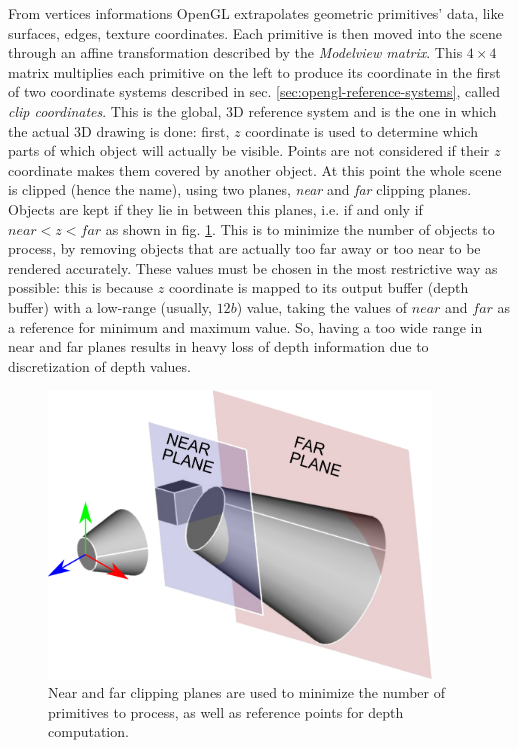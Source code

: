 From vertices informations OpenGL extrapolates geometric primitives'
data, like surfaces, edges, texture coordinates.
Each primitive is then moved into the scene through an affine transformation
described by the \emph{Modelview matrix}. This $4 \times 4$ matrix multiplies
each primitive on the left to produce its coordinate in the first of two
coordinate systems described in sec. \ref{sec:opengl-reference-systems}, called
\emph{clip coordinates}. This is the global, 3D reference system and is the one in
which the actual 3D drawing is done: first, $z$ coordinate is used to determine
which parts of which object will actually be visible. Points are not considered
if their $z$ coordinate makes them covered by another object. At this point the
whole scene is clipped (hence the name), using two planes, \emph{near} and
\emph{far} clipping planes. Objects are kept if they lie in between this planes,
i.e. if and only if $near<z<far$ as shown in fig. \ref{fig:clipping-planes}.
This is to minimize the number of objects to process, by removing objects that
are actually too far away or too near to be rendered accurately. These values
must be chosen in the most restrictive way as possible: this is because $z$
coordinate is mapped to its output buffer (depth buffer) with a low-range
(usually, $12\unit{b}$) value, taking the values of $near$ and $far$ as a
reference for minimum and maximum value. So, having a too wide range in near and
far planes results in heavy loss of depth information due to discretization of
depth values.

\begin{figure}[htbp] \label{fig:clipping-planes}
  \centering
  \includegraphics[width=4in]{./Graphics/clipping_planes}
  \caption{Near and far clipping planes are used to minimize the number of
  primitives to process, as well as reference points for depth computation.}
\end{figure}

